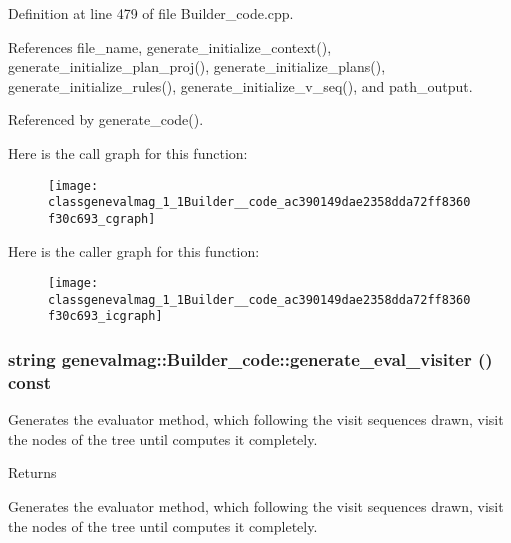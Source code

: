 Definition at line 479 of file Builder\_\-code.cpp.



References file\_\-name, generate\_\-initialize\_\-context(), generate\_\-initialize\_\-plan\_\-proj(), generate\_\-initialize\_\-plans(), generate\_\-initialize\_\-rules(), generate\_\-initialize\_\-v\_\-seq(), and path\_\-output.



Referenced by generate\_\-code().



Here is the call graph for this function:\nopagebreak
\begin{figure}[H]
\begin{center}
\leavevmode
\texttt{[image: classgenevalmag\_1\_1Builder\_\_code\_ac390149dae2358dda72ff8360f30c693\_cgraph]}
\end{center}
\end{figure}




Here is the caller graph for this function:\nopagebreak
\begin{figure}[H]
\begin{center}
\leavevmode
\texttt{[image: classgenevalmag\_1\_1Builder\_\_code\_ac390149dae2358dda72ff8360f30c693\_icgraph]}
\end{center}
\end{figure}


\hypertarget{classgenevalmag_1_1Builder__code_ad40103cc1f4217fdba2924ed1e29efdc}{
\subsubsection[{generate\_\-eval\_\-visiter}]{\setlength{\rightskip}{0pt plus 5cm}string genevalmag::Builder\_\-code::generate\_\-eval\_\-visiter () const}}
\label{classgenevalmag_1_1Builder__code_ad40103cc1f4217fdba2924ed1e29efdc}
Generates the evaluator method, which following the visit sequences drawn, visit the nodes of the tree until computes it completely. \begin{DoxyReturn}{Returns}

\end{DoxyReturn}
Generates the evaluator method, which following the visit sequences drawn, visit the nodes of the tree until computes it completely. 

